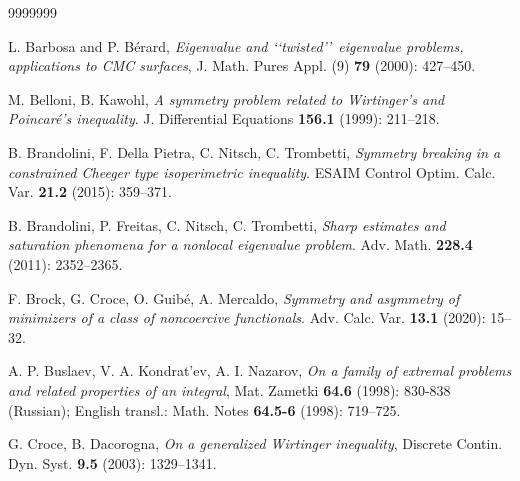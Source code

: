 \documentclass{amsart}
\theoremstyle{definition}
\theoremstyle{remark}
\begin{document}
\begin{thebibliography}{9999999}


 L. Barbosa and P. B\'erard, \textit{Eigenvalue and \lq\lq twisted\rq\rq\ eigenvalue problems, applications to CMC surfaces}, J. Math. Pures Appl. (9) {\bf 79} (2000): 427--450.

 M. Belloni, B. Kawohl, \textit{A symmetry problem related to Wirtinger's and Poincar\'e's inequality}. J. Differential Equations \textbf{156.1} (1999): 211--218.

 B. Brandolini, F. Della Pietra, C. Nitsch, C. Trombetti, \textit{Symmetry breaking in a constrained Cheeger type isoperimetric inequality}. ESAIM Control Optim. Calc. Var. \textbf{21.2} (2015): 359--371.

 B. Brandolini, P. Freitas, C. Nitsch, C. Trombetti, \textit{Sharp estimates and saturation phenomena for a nonlocal eigenvalue problem}. Adv. Math. \textbf{228.4} (2011): 2352--2365.


 F. Brock, G. Croce, O. Guib\'e, A. Mercaldo, \textit{Symmetry and asymmetry of minimizers of a class of noncoercive functionals}. Adv. Calc. Var. \textbf{13.1} (2020): 15--32.

 A. P. Buslaev, V. A. Kondrat'ev, A. I. Nazarov, \textit{On a family of extremal problems and related properties of an integral}, Mat. Zametki \textbf{64.6} (1998): 830-838 (Russian); English transl.: Math. Notes \textbf{64.5-6} (1998): 719--725. 

 G. Croce, B. Dacorogna, \textit{On a generalized Wirtinger inequality}, Discrete Contin. Dyn. Syst. \textbf{9.5} (2003): 1329--1341. 



\end{thebibliography}
\end{document}
